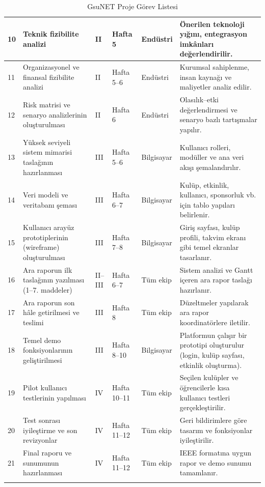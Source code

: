 \documentclass[a4paper,12pt]{report}
\begin{document}
\begin{longtable}{|p{0.5cm}|p{5cm}|p{1cm}|p{2.5cm}|p{2cm}|p{3cm}|}
10 & Teknik fizibilite analizi & II & Hafta 5 & Endüstri & Önerilen teknoloji yığını, entegrasyon imkânları değerlendirilir. \\
\hline

11 & Organizasyonel ve finansal fizibilite analizi & II & Hafta 5–6 & Endüstri & Kurumsal sahiplenme, insan kaynağı ve maliyetler analiz edilir. \\
\hline

12 & Risk matrisi ve senaryo analizlerinin oluşturulması & II & Hafta 6 & Endüstri & Olasılık–etki değerlendirmesi ve senaryo bazlı tartışmalar yapılır. \\
\hline

13 & Yüksek seviyeli sistem mimarisi taslağının hazırlanması & III & Hafta 5–6 & Bilgisayar & Kullanıcı rolleri, modüller ve ana veri akışı şemalandırılır. \\
\hline

14 & Veri modeli ve veritabanı şeması & III & Hafta 6–7 & Bilgisayar & Kulüp, etkinlik, kullanıcı, sponsorluk vb. için tablo yapıları belirlenir. \\
\hline

15 & Kullanıcı arayüz prototiplerinin (wireframe) oluşturulması & III & Hafta 7–8 & Bilgisayar & Giriş sayfası, kulüp profili, takvim ekranı gibi temel ekranlar tasarlanır. \\
\hline

16 & Ara raporun ilk taslağının yazılması (1–7. maddeler) & II–III & Hafta 6–7 & Tüm ekip & Sistem analizi ve Gantt içeren ara rapor taslağı hazırlanır. \\
\hline

17 & Ara raporun son hâle getirilmesi ve teslimi & III & Hafta 8 & Tüm ekip & Düzeltmeler yapılarak ara rapor koordinatörlere iletilir. \\
\hline

18 & Temel demo fonksiyonlarının geliştirilmesi & III & Hafta 8–10 & Bilgisayar & Platformun çalışır bir prototipi oluşturulur (login, kulüp sayfası, etkinlik oluşturma). \\
\hline

19 & Pilot kullanıcı testlerinin yapılması & IV & Hafta 10–11 & Tüm ekip & Seçilen kulüpler ve öğrencilerle kısa kullanıcı testleri gerçekleştirilir. \\
\hline

20 & Test sonrası iyileştirme ve son revizyonlar & IV & Hafta 11–12 & Tüm ekip & Geri bildirimlere göre tasarım ve fonksiyonlar iyileştirilir. \\
\hline

21 & Final raporu ve sunumunun hazırlanması & IV & Hafta 11–12 & Tüm ekip & IEEE formatına uygun rapor ve demo sunumu tamamlanır. \\
\hline

\caption{GsuNET Proje Görev Listesi}
\label{tab:gantt_tasks}
\end{longtable}
\end{document}
